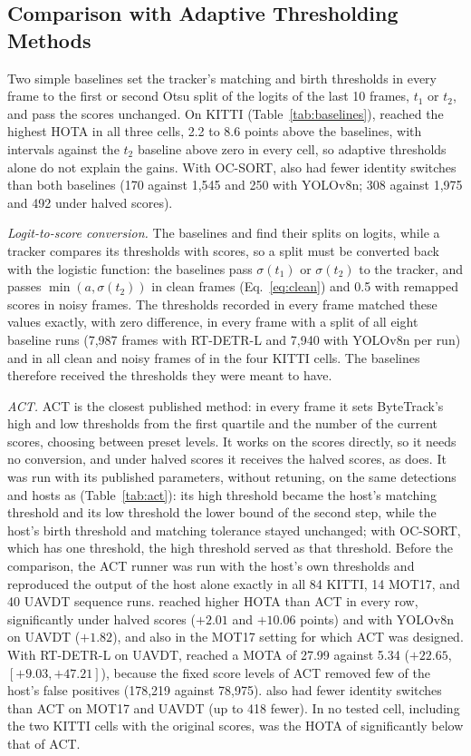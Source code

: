 \subsection{Comparison with Adaptive Thresholding Methods}\label{sec:baselines}
Two simple baselines set the tracker's matching and birth thresholds in every frame to the first or
second Otsu split of the logits of the last 10 frames, $t_1$ or $t_2$, and pass the scores
unchanged. On KITTI (Table~\ref{tab:baselines}), \scl{} reached the highest HOTA in all three
cells, 2.2 to 8.6 points above the baselines, with intervals against the $t_2$ baseline above zero
in every cell, so adaptive thresholds alone do not explain the gains. With OC-SORT, \scl{} also had
fewer identity switches than both baselines (170 against 1,545 and 250 with YOLOv8n; 308 against
1,975 and 492 under halved scores).

\emph{Logit-to-score conversion.} The baselines and \scl{} find their splits on logits, while a
tracker compares its thresholds with scores, so a split must be converted back with the logistic
function: the baselines pass $\sigma(t_1)$ or $\sigma(t_2)$ to the tracker, and \scl{} passes
$\min(a,\sigma(t_2))$ in clean frames (Eq.~\eqref{eq:clean}) and 0.5 with remapped scores in noisy
frames. The thresholds recorded in every frame matched these values exactly, with zero difference,
in every frame with a split of all eight baseline runs (7,987 frames with RT-DETR-L and 7,940
with YOLOv8n per run) and in all clean and noisy frames of \scl{} in the four KITTI cells. The baselines therefore received the thresholds they were meant to have.

\emph{ACT.} ACT \cite{act2026adaptive} is the closest published method: in every frame it sets
ByteTrack's high and low thresholds from the first quartile and the number of the current scores,
choosing between preset levels. It works on the scores directly, so it needs no conversion, and
under halved scores it receives the halved scores, as \scl{} does. It was run with its published
parameters, without retuning, on the same detections and hosts as \scl{} (Table~\ref{tab:act}):
its high threshold became the host's matching threshold and its low threshold the lower bound of
the second step, while the host's birth threshold and matching tolerance stayed unchanged; with
OC-SORT, which has one threshold, the high threshold served as that threshold. Before the
comparison, the ACT runner was run with the host's own thresholds and reproduced the output of the
host alone exactly in all 84 KITTI, 14 MOT17, and 40 UAVDT sequence runs. \scl{} reached higher HOTA
than ACT in every row, significantly under halved
scores ($+2.01$ and $+10.06$ points) and with YOLOv8n on UAVDT ($+1.82$), and also in the MOT17
setting for which ACT was designed. With RT-DETR-L on UAVDT, \scl{} reached a MOTA of 27.99 against
5.34 ($+22.65$, $[+9.03,+47.21]$), because the fixed score levels of ACT removed few of the host's
false positives (178,219 against 78,975). \scl{} also had fewer identity switches than ACT on
MOT17 and UAVDT (up to 418 fewer). In no tested cell, including the two KITTI cells with the
original scores, was the HOTA of \scl{} significantly below that of ACT.

